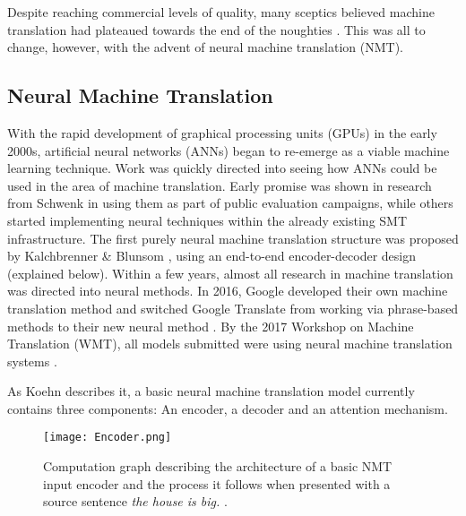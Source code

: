 \documentclass[11pt]{article}
\begin{document}
\bigskip

Despite reaching commercial levels of quality, many sceptics believed machine translation had plateaued towards the end of the noughties \citep[p. 39]{koehn2020}. This was all to change, however, with the advent of neural machine translation (NMT). 

\subsection{Neural Machine Translation}

With the rapid development of graphical processing units (GPUs) in the early 2000s, artificial neural networks (ANNs) began to re-emerge as a viable machine learning technique. Work was quickly directed into seeing how ANNs could be used in the area of machine translation. Early promise was shown in research from Schwenk \citeyearpar{schwenk} in using them as part of public evaluation campaigns, while others started implementing neural techniques within the already existing SMT infrastructure. The first purely neural machine translation structure was proposed by Kalchbrenner \& Blunsom \citeyearpar{kalchbrenner-blunsom-2013-recurrent-continuous}, using an end-to-end encoder-decoder design (explained below). Within a few years, almost all research in machine translation was directed into neural methods. In 2016, Google developed their own machine translation method \citep{wu2016googles} and switched Google Translate from working via phrase-based methods to their new neural method \citep{googleblog}. By the 2017 Workshop on Machine Translation (WMT), all models submitted were using neural machine translation systems \citep[p. 40]{koehn2020}.

\bigskip

As Koehn \citeyearpar[ch. 8]{koehn2020} describes it, a basic neural machine translation model currently contains three components: An encoder, a decoder and an attention mechanism.

\bigskip


\begin{figure}[h]
    \centering
    \texttt{[image: Encoder.png]}
    \caption{Computation graph describing the architecture of a basic NMT input encoder and the process it follows when presented with a source sentence \textit{the house is big.} \citep[p. 127]{koehn2020}.}
    \label{fig:encoder}
\end{figure}
\end{document}
